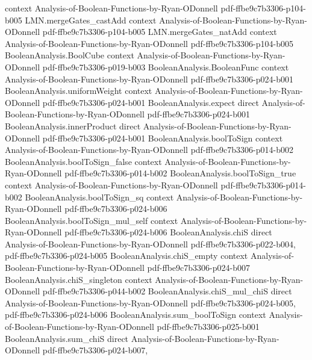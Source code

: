 \begin{lemma}
  {context}
  {Analysis-of-Boolean-Functions-by-Ryan-ODonnell}
  {pdf-ffbe9c7b3306-p104-b005}
\proofstep
  {LMN.mergeGates_castAdd}
  {context}
  {Analysis-of-Boolean-Functions-by-Ryan-ODonnell}
  {pdf-ffbe9c7b3306-p104-b005}
\proofstep
  {LMN.mergeGates_natAdd}
  {context}
  {Analysis-of-Boolean-Functions-by-Ryan-ODonnell}
  {pdf-ffbe9c7b3306-p104-b005}
\proofstep
  {BooleanAnalysis.BoolCube}
  {context}
  {Analysis-of-Boolean-Functions-by-Ryan-ODonnell}
  {pdf-ffbe9c7b3306-p019-b003}
\proofstep
  {BooleanAnalysis.BooleanFunc}
  {context}
  {Analysis-of-Boolean-Functions-by-Ryan-ODonnell}
  {pdf-ffbe9c7b3306-p024-b001}
\proofstep
  {BooleanAnalysis.uniformWeight}
  {context}
  {Analysis-of-Boolean-Functions-by-Ryan-ODonnell}
  {pdf-ffbe9c7b3306-p024-b001}
\proofstep
  {BooleanAnalysis.expect}
  {direct}
  {Analysis-of-Boolean-Functions-by-Ryan-ODonnell}
  {pdf-ffbe9c7b3306-p024-b001}
\proofstep
  {BooleanAnalysis.innerProduct}
  {direct}
  {Analysis-of-Boolean-Functions-by-Ryan-ODonnell}
  {pdf-ffbe9c7b3306-p024-b001}
\proofstep
  {BooleanAnalysis.boolToSign}
  {context}
  {Analysis-of-Boolean-Functions-by-Ryan-ODonnell}
  {pdf-ffbe9c7b3306-p014-b002}
\proofstep
  {BooleanAnalysis.boolToSign_false}
  {context}
  {Analysis-of-Boolean-Functions-by-Ryan-ODonnell}
  {pdf-ffbe9c7b3306-p014-b002}
\proofstep
  {BooleanAnalysis.boolToSign_true}
  {context}
  {Analysis-of-Boolean-Functions-by-Ryan-ODonnell}
  {pdf-ffbe9c7b3306-p014-b002}
\proofstep
  {BooleanAnalysis.boolToSign_sq}
  {context}
  {Analysis-of-Boolean-Functions-by-Ryan-ODonnell}
  {pdf-ffbe9c7b3306-p024-b006}
\proofstep
  {BooleanAnalysis.boolToSign_mul_self}
  {context}
  {Analysis-of-Boolean-Functions-by-Ryan-ODonnell}
  {pdf-ffbe9c7b3306-p024-b006}
\proofstep
  {BooleanAnalysis.chiS}
  {direct}
  {Analysis-of-Boolean-Functions-by-Ryan-ODonnell}
  {pdf-ffbe9c7b3306-p022-b004,
    pdf-ffbe9c7b3306-p024-b005}
\proofstep
  {BooleanAnalysis.chiS_empty}
  {context}
  {Analysis-of-Boolean-Functions-by-Ryan-ODonnell}
  {pdf-ffbe9c7b3306-p024-b007}
\proofstep
  {BooleanAnalysis.chiS_singleton}
  {context}
  {Analysis-of-Boolean-Functions-by-Ryan-ODonnell}
  {pdf-ffbe9c7b3306-p044-b002}
\proofstep
  {BooleanAnalysis.chiS_mul_chiS}
  {direct}
  {Analysis-of-Boolean-Functions-by-Ryan-ODonnell}
  {pdf-ffbe9c7b3306-p024-b005,
    pdf-ffbe9c7b3306-p024-b006}
\proofstep
  {BooleanAnalysis.sum_boolToSign}
  {context}
  {Analysis-of-Boolean-Functions-by-Ryan-ODonnell}
  {pdf-ffbe9c7b3306-p025-b001}
\proofstep
  {BooleanAnalysis.sum_chiS}
  {direct}
  {Analysis-of-Boolean-Functions-by-Ryan-ODonnell}
  {pdf-ffbe9c7b3306-p024-b007,
}
\end{lemma}
